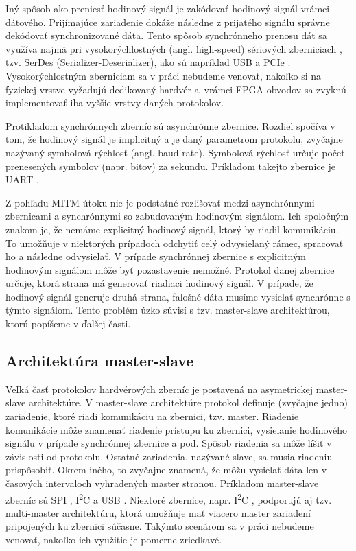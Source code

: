 Iný spôsob ako preniesť hodinový signál je zakódovať hodinový signál vrámci dátového. Prijímajúce zariadenie dokáže následne z prijatého signálu správne dekódovať synchronizované dáta. Tento spôsob synchrónneho prenosu dát sa využíva najmä pri vysokorýchlostných (angl. high-speed) sériových zberniciach \cite{serdes}, tzv. SerDes (Serializer-Deserializer), ako sú napríklad USB \cite{usbSpec} a PCIe \cite{pcieSpec}. Vysokorýchlostným zberniciam sa v práci nebudeme venovať, nakoľko si na fyzickej vrstve vyžadujú dedikovaný hardvér a~vrámci FPGA obvodov sa zvyknú implementovať iba vyššie vrstvy daných protokolov.

Protikladom synchrónnych zberníc sú asynchrónne zbernice. Rozdiel spočíva v tom, že hodinový signál je implicitný a je daný parametrom protokolu, zvyčajne nazývaný symbolová rýchlosť (angl. baud rate). Symbolová rýchlosť určuje počet prenesených symbolov (napr. bitov) za sekundu. Príkladom takejto zbernice je UART \cite{uartBus}.

Z pohľadu MITM útoku nie je podstatné rozlišovať medzi asynchrónnymi zbernicami a synchrónnymi so zabudovaným hodinovým signálom. Ich spoločným znakom je, že nemáme explicitný hodinový signál, ktorý by riadil komunikáciu. To umožňuje v niektorých prípadoch odchytiť celý odvysielaný rámec, spracovať ho a následne odvysielať. V prípade synchrónnej zbernice s explicitným hodinovým signálom môže byť pozastavenie nemožné. Protokol danej zbernice určuje, ktorá strana má generovať riadiaci hodinový signál. V prípade, že hodinový signál generuje druhá strana, falošné dáta musíme vysielať synchrónne s týmto signálom. Tento problém úzko súvisí s tzv. master-slave architektúrou, ktorú popíšeme v ďalšej časti.

\subsection{Architektúra master-slave} \label{sek:masterSlave}
Veľká časť protokolov hardvérových zberníc je postavená na asymetrickej master-slave architektúre. V master-slave architektúre protokol definuje (zvyčajne jedno) zariadenie, ktoré riadi komunikáciu na zbernici, tzv. master. Riadenie komunikácie môže znamenať riadenie prístupu ku zbernici, vysielanie hodinového signálu v prípade synchrónnej zbernice a pod. Spôsob riadenia sa môže líšiť v závislosti od protokolu. Ostatné zariadenia, nazývané slave, sa musia riadeniu prispôsobiť. Okrem iného, to zvyčajne znamená, že môžu vysielať dáta len v časových intervaloch vyhradených master stranou. Príkladom master-slave zberníc sú SPI \cite{spiBus}, I\textsuperscript{2}C \cite{i2cSpec} a USB \cite{usbSpec}. Niektoré zbernice, napr. I\textsuperscript{2}C \cite{i2cSpec}, podporujú aj tzv. multi-master architektúru, ktorá umožňuje mať viacero master zariadení pripojených ku zbernici súčasne. Takýmto scenárom sa v práci nebudeme venovať, nakoľko ich využitie je pomerne zriedkavé.

